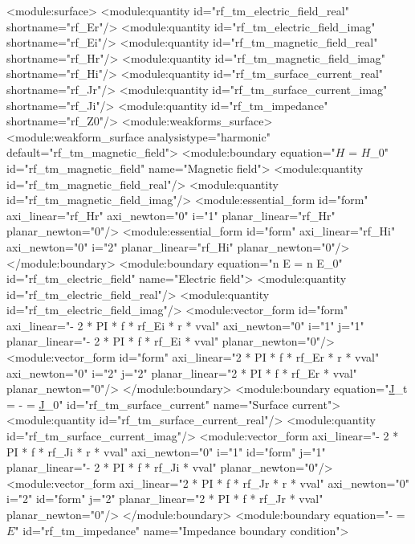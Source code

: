 \documentclass[12pt,a4paper,oneside]{article}
\numberwithin{equation}{section} %
\numberwithin{figure}{section} %
\numberwithin{table}{section} %
\newcommand{\mj}{\mathrm{j}} %
\newcommand{\faz}[1]{{\underline{#1}}} %
\newcommand{\vecfaz}[1]{\mbox{\underline{\boldmath$#1$}}} %
\begin{document}
\begin{spverbatim}
 <module:surface>
    <module:quantity id="rf_tm_electric_field_real" shortname="rf_Er"/>
    <module:quantity id="rf_tm_electric_field_imag" shortname="rf_Ei"/>
    <module:quantity id="rf_tm_magnetic_field_real" shortname="rf_Hr"/>
    <module:quantity id="rf_tm_magnetic_field_imag" shortname="rf_Hi"/>
    <module:quantity id="rf_tm_surface_current_real" shortname="rf_Jr"/>
    <module:quantity id="rf_tm_surface_current_imag" shortname="rf_Ji"/>
    <module:quantity id="rf_tm_impedance" shortname="rf_Z0"/>
    <module:weakforms_surface>
      <module:weakform_surface analysistype="harmonic" default="rf_tm_magnetic_field">
        <module:boundary equation="\vecfaz{H} = \vecfaz{H}_0" id="rf_tm_magnetic_field" name="Magnetic field">
          <module:quantity id="rf_tm_magnetic_field_real"/>
          <module:quantity id="rf_tm_magnetic_field_imag"/>
          <module:essential_form id="form" axi_linear="rf_Hr" axi_newton="0" i="1" planar_linear="rf_Hr" planar_newton="0"/>
          <module:essential_form id="form" axi_linear="rf_Hi" axi_newton="0" i="2" planar_linear="rf_Hi" planar_newton="0"/>
        </module:boundary>
        <module:boundary equation="n \times E = n \times E_0" id="rf_tm_electric_field" name="Electric field">
          <module:quantity id="rf_tm_electric_field_real"/>
          <module:quantity id="rf_tm_electric_field_imag"/>
          <module:vector_form id="form" axi_linear="- 2 * PI * f * rf_Ei * r * vval" axi_newton="0" i="1" j="1" planar_linear="- 2 * PI * f * rf_Ei * vval" planar_newton="0"/>
          <module:vector_form id="form" axi_linear="2 * PI * f * rf_Er * r * vval" axi_newton="0" i="2" j="2" planar_linear="2 * PI * f * rf_Er * vval" planar_newton="0"/>
        </module:boundary>
        <module:boundary equation="\faz{J}_{t} = -  \frac{\partial \vecfaz{E}}{\partial n_0} = \faz{J}_0" id="rf_tm_surface_current" name="Surface current">
          <module:quantity id="rf_tm_surface_current_real"/>
          <module:quantity id="rf_tm_surface_current_imag"/>
          <module:vector_form axi_linear="- 2 * PI * f * rf_Ji * r * vval" axi_newton="0" i="1" id="form" j="1" planar_linear="- 2 * PI * f * rf_Ji * vval" planar_newton="0"/>
          <module:vector_form axi_linear="2 * PI * f * rf_Jr * r * vval" axi_newton="0" i="2" id="form" j="2" planar_linear="2 * PI * f * rf_Jr * vval" planar_newton="0"/>
        </module:boundary>
        <module:boundary equation="-  \frac{\partial \vecfaz{E}}{\partial n_0} = \sqrt{\frac{\varepsilon - \mj \sigma / \omega}{\mu}} \vecfaz{E}" id="rf_tm_impedance" name="Impedance boundary condition">

\end{spverbatim}
\end{document}
